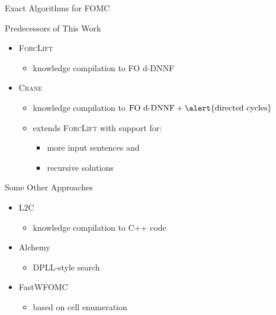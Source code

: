 \documentclass{beamer}
\begin{document}
\begin{frame}{Exact Algorithms for FOMC}
  \begin{block}{Predecessors of This Work}
    \begin{itemize}
      \item
            \alert{\textsc{ForcLift}}~\textcolor{gray}{\parencite{DBLP:conf/ijcai/BroeckTMDR11}}
            \begin{itemize}
              \item knowledge compilation to \alert{FO d-DNNF}
            \end{itemize}
      \item \alert{\textsc{Crane}}~\textcolor{gray}{\parencite{DBLP:conf/kr/DilkasB23}}
            \begin{itemize}
              \item knowledge compilation to $\text{FO
                    d-DNNF} + \alert{\text{directed cycles}}$
              \item extends \alert{\textsc{ForcLift}} with support for:
                    \begin{itemize}
                      \item more input sentences and
                      \item recursive solutions
                    \end{itemize}
            \end{itemize}
    \end{itemize}
  \end{block}
  \pause
  \begin{block}{Some Other Approaches}
    \begin{itemize}
      \item \alert{L2C}~\textcolor{gray}{\parencite{DBLP:conf/kr/KazemiP16}}
            \begin{itemize}
              \item knowledge compilation to \alert{C++} code
            \end{itemize}
      \item
            \alert{Alchemy}~\textcolor{gray}{\parencite{DBLP:journals/cacm/GogateD16}}
            \begin{itemize}
              \item \alert{DPLL}-style search
            \end{itemize}
      \item
            \alert{FastWFOMC}~\textcolor{gray}{\parencite{DBLP:conf/uai/BremenK21}}
            \begin{itemize}
              \item based on \alert{cell enumeration}
            \end{itemize}
    \end{itemize}
  \end{block}
\end{frame}
\end{document}
